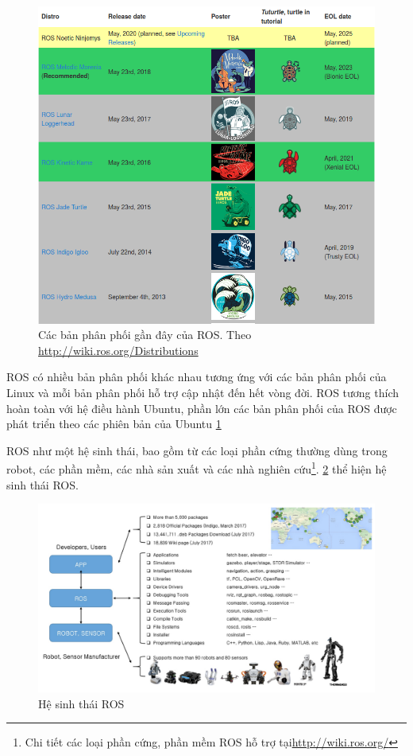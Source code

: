 \begin{figure}[htbp]
  \centering
  \includegraphics[width=0.9\linewidth]{figures/ROS-ditributions.png} 
  \caption{Các bản phân phối gần đây của ROS. Theo \url{http://wiki.ros.org/Distributions}}
  \label{fig:ROS-distributions}
\end{figure}

ROS có nhiều bản phân phối khác nhau tương ứng với các bản phân phối của Linux và mỗi bản phân phối hỗ trợ cập nhật đến hết vòng đời. ROS tương thích hoàn toàn với hệ điều hành Ubuntu, phần lớn các bản phân phối của ROS được phát triển theo các phiên bản của Ubuntu \figurename{\ref{fig:ROS-distributions}}

ROS như một hệ sinh thái, bao gồm từ các loại phần cứng thường dùng trong robot, các phần mềm, các nhà sản xuất và các nhà nghiên cứu\footnote{Chi tiết các loại phần cứng, phần mềm ROS hỗ trợ tại\url{http://wiki.ros.org/}}. \figurename{\ref{fig:Ecosystem}} thể hiện hệ sinh thái ROS. 

\begin{figure}[htbp]
	\centering
	\includegraphics[width=1\linewidth]{figures/Ecosystem.pdf}
	\caption{Hệ sinh thái ROS \cite{pyo2017ros}}
	\label{fig:Ecosystem}
\end{figure}

